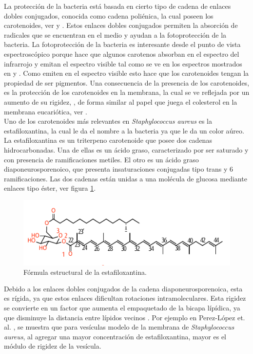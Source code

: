 La protecci\'{o}n de la bacteria est\'{a} basada en cierto tipo de cadena de enlaces dobles conjugados, conocida como cadena poli\'{e}nica, la cual poseen los carotenoides, ver \cite{Nelson2011} y \cite{Gruszecki2004CarotenoidsProperties}. Estos enlaces dobles conjugados permiten la absorci\'{o}n de radicales que se encuentran en el medio y ayudan a la fotoprotecci\'{o}n de la bacteria. La fotoprotecci\'{o}n de la bacteria es interesante desde el punto de vista espectrosc\'{o}pico porque  hace que algunos carotenos absorban en el espectro del infrarrojo y emitan el espectro visible tal como se ve en los espectros mostrados en \cite{Gruszecki2004CarotenoidsProperties} y \cite{Wimpfheimer2015ACompounds}. Como emiten en el espectro visible esto hace que los carotenoides tengan la propiedad de ser pigmentos. Una consecuencia de la presencia de los carotenoides, es la protecci\'{o}n de los carotenoides en la membrana, la cual se ve reflejada por un aumento de su rigidez, \cite{Gruszecki2004CarotenoidsProperties}, de forma similar al papel que juega el colesterol en la membrana eucari\'{o}tica, ver \cite{Bagatolli2017VidaGrasas}.\\

Uno de los carotenoides m\'{a}s relevantes en \textit{Staphylococcus aureus} es la estafiloxantina, la cual le da el nombre a la bacteria ya que le da un color a\'{u}reo. La estafiloxantina es un  triterpeno carotenoide que posee dos cadenas hidrocarbonadas. Una de ellas es un \'{a}cido graso, caracterizado por ser saturado y con presencia de ramificaciones metiles. El otro es un \'{a}cido graso diaponeurosporenoico, que presenta insaturaciones conjugadas tipo trans y 6 ramificaciones. Las dos cadenas est\'{a}n unidas a una mol\'{e}cula de glucosa mediante enlaces tipo \'{e}ster, ver figura \ref{fig:stx}.\\

\begin{figure}[h]
\begin{center}
  \includegraphics[scale=1.4]{Kap2/stx2.pdf}
  \caption{F\'{o}rmula estructural de la estafiloxantina.}
  \label{fig:stx}
\end{center}
\end{figure}
Debido a los enlaces dobles conjugados de la cadena diaponeurosporenoica, esta es r\'{i}gida, ya que estos enlaces dificultan rotaciones intramoleculares. Esta rigidez se convierte en un factor que aumenta el empaquetado de la bicapa l\'{i}p\'{i}dica, ya que disminuye la distancia entre l\'{i}pidos vecinos \cite{Heimburg}. Por ejemplo en Perez-L\'{o}pez et. al. \cite{Perez-Lopez2019VariationsProperties}, se muestra que para ves\'{i}culas modelo de la membrana de \textit{Staphylococcus aureus}, al agregar una mayor concentraci\'{o}n de estafiloxantina, mayor es el m\'{o}dulo de rigidez de la ves\'{i}cula. \\

